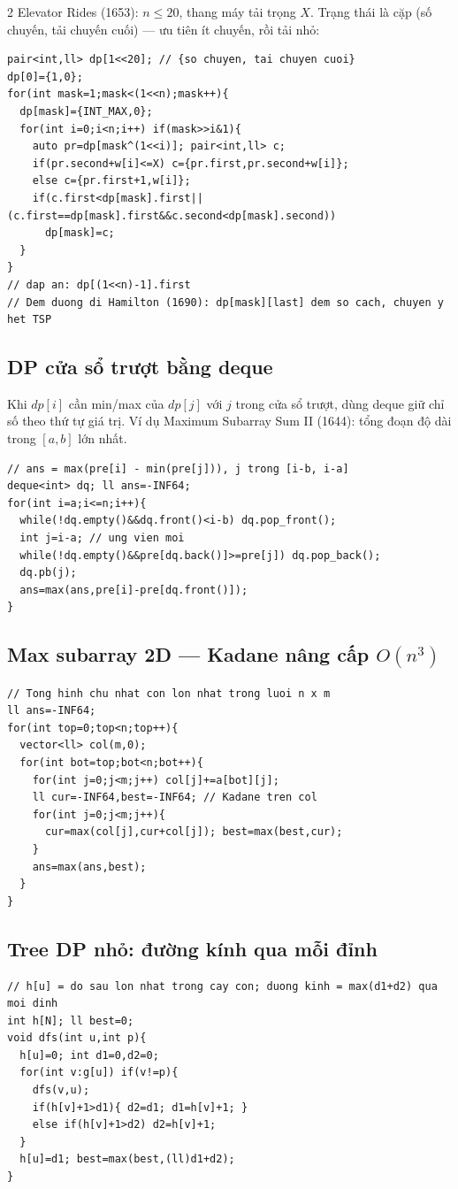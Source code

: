 \documentclass[8pt]{extarticle}
\begin{document}
\begin{multicols}{2}
Elevator Rides (1653): $n\le 20$, thang máy tải trọng $X$. Trạng thái là cặp (số chuyến, tải chuyến cuối) --- ưu tiên ít chuyến, rồi tải nhỏ:
\begin{lstlisting}
pair<int,ll> dp[1<<20]; // {so chuyen, tai chuyen cuoi}
dp[0]={1,0};
for(int mask=1;mask<(1<<n);mask++){
  dp[mask]={INT_MAX,0};
  for(int i=0;i<n;i++) if(mask>>i&1){
    auto pr=dp[mask^(1<<i)]; pair<int,ll> c;
    if(pr.second+w[i]<=X) c={pr.first,pr.second+w[i]};
    else c={pr.first+1,w[i]};
    if(c.first<dp[mask].first||(c.first==dp[mask].first&&c.second<dp[mask].second))
      dp[mask]=c;
  }
}
// dap an: dp[(1<<n)-1].first
// Dem duong di Hamilton (1690): dp[mask][last] dem so cach, chuyen y het TSP
\end{lstlisting}

\subsection{DP cửa sổ trượt bằng deque}
Khi $dp[i]$ cần min/max của $dp[j]$ với $j$ trong cửa sổ trượt, dùng deque giữ chỉ số theo thứ tự giá trị. Ví dụ Maximum Subarray Sum II (1644): tổng đoạn độ dài trong $[a,b]$ lớn nhất.
\begin{lstlisting}
// ans = max(pre[i] - min(pre[j])), j trong [i-b, i-a]
deque<int> dq; ll ans=-INF64;
for(int i=a;i<=n;i++){
  while(!dq.empty()&&dq.front()<i-b) dq.pop_front();
  int j=i-a; // ung vien moi
  while(!dq.empty()&&pre[dq.back()]>=pre[j]) dq.pop_back();
  dq.pb(j);
  ans=max(ans,pre[i]-pre[dq.front()]);
}
\end{lstlisting}

\subsection{Max subarray 2D --- Kadane nâng cấp $O(n^3)$}
\begin{lstlisting}
// Tong hinh chu nhat con lon nhat trong luoi n x m
ll ans=-INF64;
for(int top=0;top<n;top++){
  vector<ll> col(m,0);
  for(int bot=top;bot<n;bot++){
    for(int j=0;j<m;j++) col[j]+=a[bot][j];
    ll cur=-INF64,best=-INF64; // Kadane tren col
    for(int j=0;j<m;j++){
      cur=max(col[j],cur+col[j]); best=max(best,cur);
    }
    ans=max(ans,best);
  }
}
\end{lstlisting}

\subsection{Tree DP nhỏ: đường kính qua mỗi đỉnh}
\begin{lstlisting}
// h[u] = do sau lon nhat trong cay con; duong kinh = max(d1+d2) qua moi dinh
int h[N]; ll best=0;
void dfs(int u,int p){
  h[u]=0; int d1=0,d2=0;
  for(int v:g[u]) if(v!=p){
    dfs(v,u);
    if(h[v]+1>d1){ d2=d1; d1=h[v]+1; }
    else if(h[v]+1>d2) d2=h[v]+1;
  }
  h[u]=d1; best=max(best,(ll)d1+d2);
}
\end{lstlisting}


\end{multicols}
\end{document}
